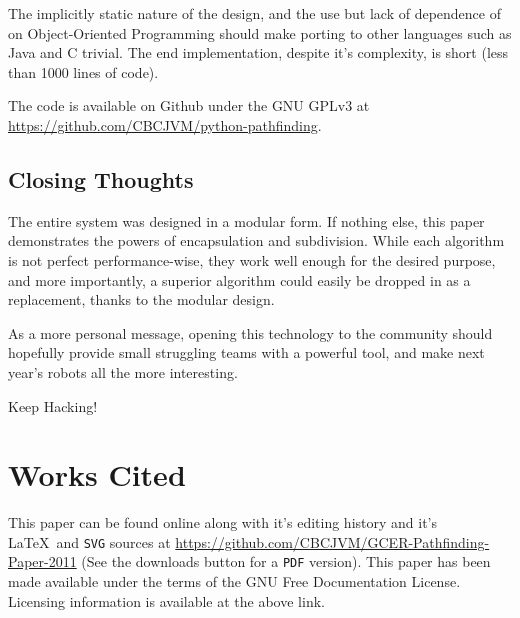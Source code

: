 \documentclass[letterpaper, 12pt]{article}
\begin{document}
\begin{multicols}{2}
The implicitly static nature of the design, and the use but lack of dependence
of on Object-Oriented Programming should make porting to other languages such as
Java and C trivial. The end implementation, despite it's complexity, is short
(less than 1000 lines of code).

The code is available on Github under the GNU GPLv3 at
\url{https://github.com/CBCJVM/python-pathfinding}.

\subsection{Closing Thoughts}

The entire system was designed in a modular form. If nothing else, this paper
demonstrates the powers of encapsulation and subdivision. While each algorithm
is not perfect performance-wise, they work well enough for the desired purpose,
and more importantly, a superior algorithm could easily be dropped in as a
replacement, thanks to the modular design.

As a more personal message, opening this technology to the community should
hopefully provide small struggling teams with a powerful tool, and make next
year's robots all the more interesting.

Keep Hacking!

\section{Works Cited}

\printbibliography[heading=blank]

\end{multicols}

\vfill

\begin{footnotesize}
    This paper can be found online along with it's editing history and it's
    \LaTeX \ and \texttt{SVG} sources at
    \url{https://github.com/CBCJVM/GCER-Pathfinding-Paper-2011} (See the
    downloads button for a \texttt{PDF} version). This paper has been made
    available under the terms of the GNU Free Documentation License. Licensing
    information is available at the above link.
\end{footnotesize}
\end{document}
